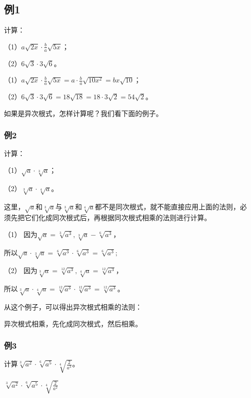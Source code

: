 \subsection{例1}

计算：

（1）\(a\sqrt{2x} \cdot \frac{b}{a}\sqrt{5x}\)；

（2）\(6\sqrt{3} \cdot 3\sqrt{6}\)。

（1）\(a\sqrt{2x} \cdot \frac{b}{a}\sqrt{5x} = a \cdot \frac{b}{a}\sqrt{10x^2} = bx\sqrt{10}\)；

（2）\(6\sqrt{3} \cdot 3\sqrt{6} = 18\sqrt{18} = 18 \cdot 3\sqrt{2} = 54\sqrt{2}\)。

如果是异次根式，怎样计算呢？我们看下面的例子。

\subsubsection{例2}

计算：

（1）\(\sqrt{a} \cdot \sqrt[3]{a}\)；

（2）\(\sqrt[3]{a} \cdot \sqrt[4]{a}\)。

这里，\(\sqrt{a}\)和\(\sqrt[3]{a}\)与\(\sqrt[3]{a}\)和\(\sqrt[4]{a}\)都不是同次根式，就不能直接应用上面的法则，必须先把它们化成同次根式后，再根据同次根式相乘的法则进行计算。

 （1）
因为\(\sqrt{a} = \sqrt[3]{a^3}, \sqrt[3]{a} - \sqrt[6]{a^3}\)，

所以\(\sqrt{a} \cdot \sqrt[3]{a} = \sqrt[6]{a^3} \cdot \sqrt[6]{a^3} = \sqrt[6]{a^3};\)

（2）
因为\(\sqrt[3]{a} = \sqrt[12]{a^3}, \sqrt[4]{a} = \sqrt[12]{a^3}\)，

所以\(\sqrt[3]{a} \cdot \sqrt[4]{a} = \sqrt[12]{a^3} \cdot \sqrt[12]{a^3} = \sqrt[12]{a^3}\)。

从这个例子，可以得出异次根式相乘的法则：

异次根式相乘，先化成同次根式，然后相乘。

\subsubsection{例3}

计算\(\sqrt[3]{a^2} \cdot \sqrt[6]{a^5} \cdot \sqrt[4]{\frac{2}{a^3}}\)。

\(\sqrt[3]{a^2} \cdot \sqrt[6]{a^5} \cdot \sqrt[4]{\frac{2}{a^2}}\)

